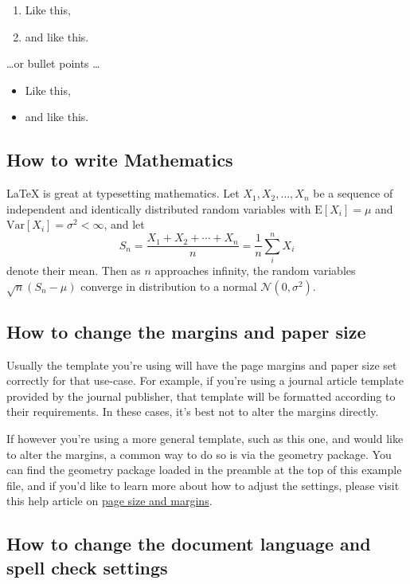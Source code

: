 \documentclass{article}
\begin{document}
\begin{enumerate}
\item Like this,
\item and like this.
\end{enumerate}
\dots or bullet points \dots
\begin{itemize}
\item Like this,
\item and like this.
\end{itemize}

\subsection{How to write Mathematics}

\LaTeX{} is great at typesetting mathematics. Let $X_1, X_2, \ldots, X_n$ be a sequence of independent and identically distributed random variables with $\text{E}[X_i] = \mu$ and $\text{Var}[X_i] = \sigma^2 < \infty$, and let
\[S_n = \frac{X_1 + X_2 + \cdots + X_n}{n}
      = \frac{1}{n}\sum_{i}^{n} X_i\]
denote their mean. Then as $n$ approaches infinity, the random variables $\sqrt{n}(S_n - \mu)$ converge in distribution to a normal $\mathcal{N}(0, \sigma^2)$.


\subsection{How to change the margins and paper size}

Usually the template you're using will have the page margins and paper size set correctly for that use-case. For example, if you're using a journal article template provided by the journal publisher, that template will be formatted according to their requirements. In these cases, it's best not to alter the margins directly.

If however you're using a more general template, such as this one, and would like to alter the margins, a common way to do so is via the geometry package. You can find the geometry package loaded in the preamble at the top of this example file, and if you'd like to learn more about how to adjust the settings, please visit this help article on \href{https://www.superpaper.com/learn/latex/page_size_and_margins}{page size and margins}.

\subsection{How to change the document language and spell check settings}
\end{document}
